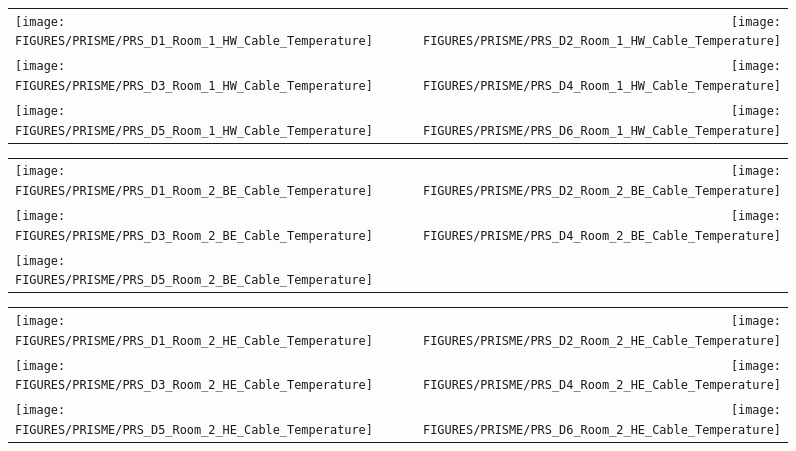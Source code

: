 \begin{figure}[p]
\begin{tabular*}{\textwidth}{l@{\extracolsep{\fill}}r}
\texttt{[image: FIGURES/PRISME/PRS\_D1\_Room\_1\_HW\_Cable\_Temperature]} &
\texttt{[image: FIGURES/PRISME/PRS\_D2\_Room\_1\_HW\_Cable\_Temperature]} \\
\texttt{[image: FIGURES/PRISME/PRS\_D3\_Room\_1\_HW\_Cable\_Temperature]} &
\texttt{[image: FIGURES/PRISME/PRS\_D4\_Room\_1\_HW\_Cable\_Temperature]} \\
\texttt{[image: FIGURES/PRISME/PRS\_D5\_Room\_1\_HW\_Cable\_Temperature]} &
\texttt{[image: FIGURES/PRISME/PRS\_D6\_Room\_1\_HW\_Cable\_Temperature]}
\end{tabular*}
\label{PRISME_HW_Cable_Room_1}
\end{figure}

\begin{figure}[p]
\begin{tabular*}{\textwidth}{l@{\extracolsep{\fill}}r}
\texttt{[image: FIGURES/PRISME/PRS\_D1\_Room\_2\_BE\_Cable\_Temperature]} &
\texttt{[image: FIGURES/PRISME/PRS\_D2\_Room\_2\_BE\_Cable\_Temperature]} \\
\texttt{[image: FIGURES/PRISME/PRS\_D3\_Room\_2\_BE\_Cable\_Temperature]} &
\texttt{[image: FIGURES/PRISME/PRS\_D4\_Room\_2\_BE\_Cable\_Temperature]} \\
\texttt{[image: FIGURES/PRISME/PRS\_D5\_Room\_2\_BE\_Cable\_Temperature]} &

\end{tabular*}
\label{PRISME_BE_Cable_Room_2}
\end{figure}

\begin{figure}[p]
\begin{tabular*}{\textwidth}{l@{\extracolsep{\fill}}r}
\texttt{[image: FIGURES/PRISME/PRS\_D1\_Room\_2\_HE\_Cable\_Temperature]} &
\texttt{[image: FIGURES/PRISME/PRS\_D2\_Room\_2\_HE\_Cable\_Temperature]} \\
\texttt{[image: FIGURES/PRISME/PRS\_D3\_Room\_2\_HE\_Cable\_Temperature]} &
\texttt{[image: FIGURES/PRISME/PRS\_D4\_Room\_2\_HE\_Cable\_Temperature]} \\
\texttt{[image: FIGURES/PRISME/PRS\_D5\_Room\_2\_HE\_Cable\_Temperature]} &
\texttt{[image: FIGURES/PRISME/PRS\_D6\_Room\_2\_HE\_Cable\_Temperature]}
\end{tabular*}
\label{PRISME_HE_Cable_Room_2}
\end{figure}

